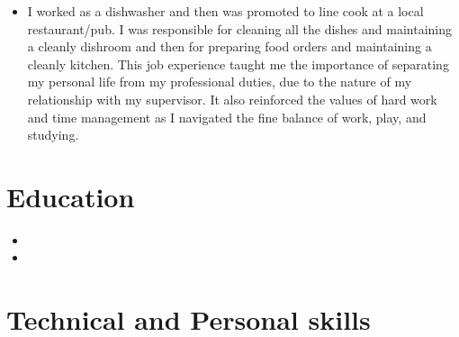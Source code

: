 \documentclass[11pt,a4paper,sans]{moderncv}        %
\begin{document}
\begin{itemize}
\vspace{6pt}

\item{
	{\vspace{3pt}
		I worked as a dishwasher and then was promoted to line cook at a local restaurant/pub. I was responsible for cleaning all the dishes and maintaining a cleanly dishroom and then for preparing food orders and maintaining a cleanly kitchen. This job experience taught me the importance of separating my personal life from my professional duties, due to the nature of my relationship with my supervisor. It also reinforced the values of hard work and time management as I navigated the fine balance of work, play, and studying.}}

\end{itemize}

\section{Education}

\vspace{5pt}
%
%

\begin{itemize}

\item{}

\item{}  %

\end{itemize}

\vspace{2pt}

\section{Technical and Personal skills}
\end{document}
